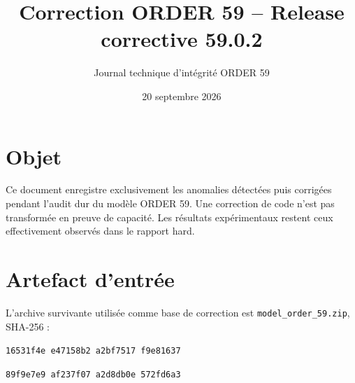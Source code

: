 \documentclass[11pt,a4paper]{article}
\title{Correction ORDER 59 -- Release corrective 59.0.2}
\author{Journal technique d'intégrité ORDER 59}
\date{20 septembre 2026}
\begin{document}
\maketitle

\section{Objet}
Ce document enregistre exclusivement les anomalies détectées puis corrigées pendant l'audit dur du modèle ORDER 59. Une correction de code n'est pas transformée en preuve de capacité. Les résultats expérimentaux restent ceux effectivement observés dans le rapport hard.

\section{Artefact d'entrée}
L'archive survivante utilisée comme base de correction est 
\texttt{model\_order\_59.zip}, SHA-256 :
\begin{center}\texttt{16531f4e e47158b2 a2bf7517 f9e81637}\par\texttt{89f9e7e9 af237f07 a2d8db0e 572fd6a3}\end{center}
\end{document}

